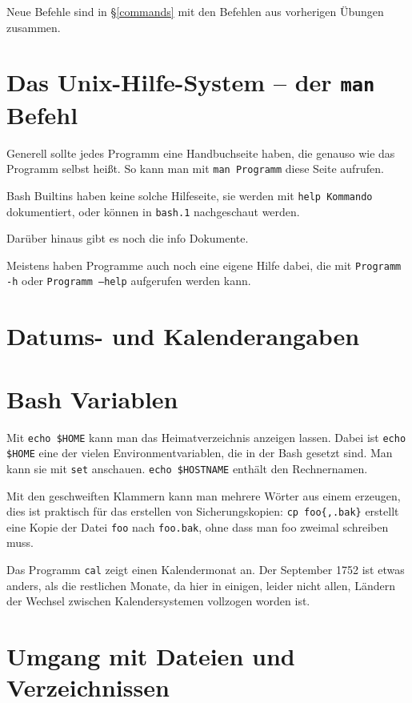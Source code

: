 Neue Befehle sind in §\ref{commands} mit den Befehlen aus vorherigen Übungen zusammen.

\section{Das Unix-Hilfe-System -- der \texttt{man} Befehl}

Generell sollte jedes Programm eine Handbuchseite haben, die genauso wie das Programm selbst heißt. So kann man mit \texttt{man Programm} diese Seite aufrufen.

Bash Builtins haben keine solche Hilfeseite, sie werden mit \texttt{help Kommando} dokumentiert, oder können in \texttt{bash.1} nachgeschaut werden.

Darüber hinaus gibt es noch die info Dokumente.

Meistens haben Programme auch noch eine eigene Hilfe dabei, die mit \texttt{Programm -h} oder \texttt{Programm --help} aufgerufen werden kann.

\section{Datums- und Kalenderangaben}

\section{Bash Variablen}

Mit \texttt{echo \${HOME}} kann man das Heimatverzeichnis anzeigen lassen. Dabei ist \texttt{echo \$HOME} eine der vielen Environmentvariablen, die in der Bash gesetzt sind. Man kann sie mit \texttt{set} anschauen. \texttt{echo \${HOSTNAME}} enthält den Rechnernamen.

Mit den geschweiften Klammern kann man mehrere Wörter aus einem erzeugen, dies ist praktisch für das erstellen von Sicherungskopien: \verb#cp foo{,.bak}# erstellt eine Kopie der Datei \texttt{foo} nach \texttt{foo.bak}, ohne dass man foo zweimal schreiben muss.

Das Programm \texttt{cal} zeigt einen Kalendermonat an. Der September 1752 ist etwas anders, als die restlichen Monate, da hier in einigen, leider nicht allen, Ländern der Wechsel zwischen Kalendersystemen vollzogen worden ist.

\section{Umgang mit Dateien und Verzeichnissen}

